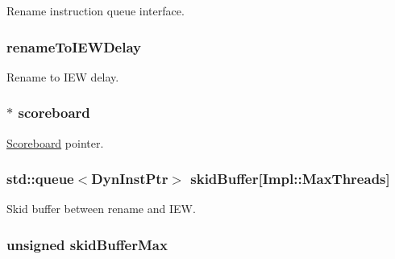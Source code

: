 \label{classDefaultIEW_ae9b536282159ba75153a223be77515ba}
Rename instruction queue interface. \hypertarget{classDefaultIEW_a72426b859bd857b77c8402cc6bc1ac7a}{
\subsubsection[{renameToIEWDelay}]{ {\bf renameToIEWDelay}}}
\label{classDefaultIEW_a72426b859bd857b77c8402cc6bc1ac7a}
Rename to IEW delay. \hypertarget{classDefaultIEW_a265ad15229da2a6a05f908da093b3ed5}{
\subsubsection[{scoreboard}]{$\ast$ {\bf scoreboard}}}
\label{classDefaultIEW_a265ad15229da2a6a05f908da093b3ed5}
\hyperlink{classScoreboard}{Scoreboard} pointer. \hypertarget{classDefaultIEW_a911bfd7c5c1efbd9f479d2b960078ec1}{
\subsubsection[{skidBuffer}]{\setlength{\rightskip}{0pt plus 5cm}std::queue$<${\bf DynInstPtr}$>$ {\bf skidBuffer}\mbox{[}Impl::MaxThreads\mbox{]}}}
\label{classDefaultIEW_a911bfd7c5c1efbd9f479d2b960078ec1}
Skid buffer between rename and IEW. \hypertarget{classDefaultIEW_a268414a6444b620140f263013a739a17}{
\subsubsection[{skidBufferMax}]{\setlength{\rightskip}{0pt plus 5cm}unsigned {\bf skidBufferMax}}}
\label{classDefaultIEW_a268414a6444b620140f263013a739a17}

